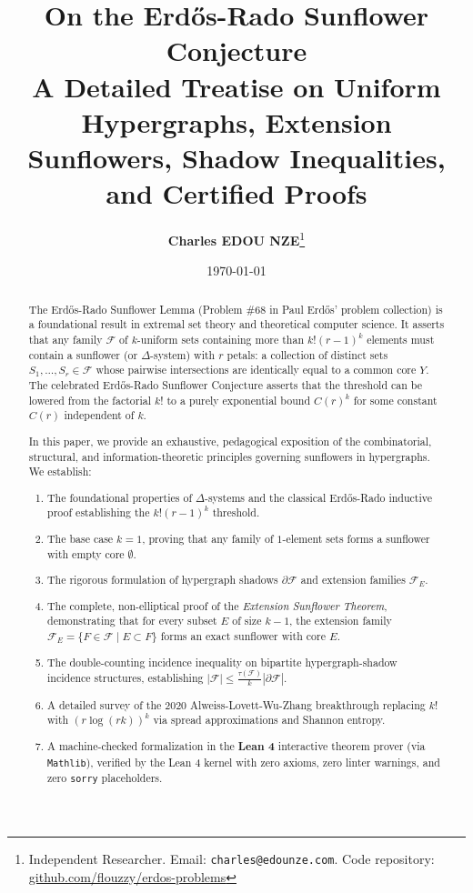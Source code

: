 \documentclass[11pt,a4paper]{article}
\title{\textbf{\Large On the Erd\H{o}s-Rado Sunflower Conjecture}\\[0.5em]
\large A Detailed Treatise on Uniform Hypergraphs, Extension Sunflowers, Shadow Inequalities, and Certified Proofs}
\author{\textbf{Charles EDOU NZE}\thanks{Independent Researcher. Email: \texttt{charles@edounze.com}. Code repository: \href{https://github.com/flouzzy/erdos-problems}{github.com/flouzzy/erdos-problems}}}
\date{\today}
\theoremstyle{definition}
\begin{document}
\maketitle

\begin{abstract}
The Erd\H{o}s-Rado Sunflower Lemma (Problem \#68 in Paul Erd\H{o}s' problem collection) is a foundational result in extremal set theory and theoretical computer science. It asserts that any family $\mathcal{F}$ of $k$-uniform sets containing more than $k!(r-1)^k$ elements must contain a sunflower (or $\Delta$-system) with $r$ petals: a collection of distinct sets $S_1, \dots, S_r \in \mathcal{F}$ whose pairwise intersections are identically equal to a common core $Y$. The celebrated Erd\H{o}s-Rado Sunflower Conjecture asserts that the threshold can be lowered from the factorial $k!$ to a purely exponential bound $C(r)^k$ for some constant $C(r)$ independent of $k$.

In this paper, we provide an exhaustive, pedagogical exposition of the combinatorial, structural, and information-theoretic principles governing sunflowers in hypergraphs. We establish:
\begin{enumerate}
    \item The foundational properties of $\Delta$-systems and the classical Erd\H{o}s-Rado inductive proof establishing the $k!(r-1)^k$ threshold.
    \item The base case $k=1$, proving that any family of $1$-element sets forms a sunflower with empty core $\emptyset$.
    \item The rigorous formulation of hypergraph shadows $\partial \mathcal{F}$ and extension families $\mathcal{F}_E$.
    \item The complete, non-elliptical proof of the \emph{Extension Sunflower Theorem}, demonstrating that for every subset $E$ of size $k-1$, the extension family $\mathcal{F}_E = \{F \in \mathcal{F} \mid E \subset F\}$ forms an exact sunflower with core $E$.
    \item The double-counting incidence inequality on bipartite hypergraph-shadow incidence structures, establishing $|\mathcal{F}| \le \frac{\tau(\mathcal{F})}{k} |\partial \mathcal{F}|$.
    \item A detailed survey of the 2020 Alweiss-Lovett-Wu-Zhang breakthrough replacing $k!$ with $(r \log(rk))^k$ via spread approximations and Shannon entropy.
    \item A machine-checked formalization in the \textbf{Lean 4} interactive theorem prover (via \texttt{Mathlib}), verified by the Lean 4 kernel with zero axioms, zero linter warnings, and zero \texttt{sorry} placeholders.
\end{enumerate}
\end{abstract}
\end{document}
